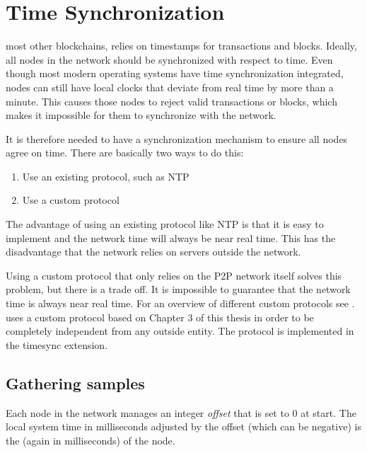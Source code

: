\section{Time Synchronization}
\label{sec:timesync}


 most other blockchains, \codenamespace relies on timestamps for transactions and blocks.
Ideally, all nodes in the network should be synchronized with respect to time.
Even though most modern operating systems have time synchronization integrated,
nodes can still have local clocks that deviate from real time by more than a minute.
This causes those nodes to reject valid transactions or blocks, which makes it impossible for them to synchronize with the network.

It is therefore needed to have a synchronization mechanism to ensure all nodes agree on time.
There are basically two ways to do this:
\begin{enumerate}
\item Use an existing protocol, such as NTP
\item Use a custom protocol
\end{enumerate}

The advantage of using an existing protocol like NTP is that it is easy to implement and the network time will always be near real time.
This has the disadvantage that the network relies on servers outside the network.

Using a custom protocol that only relies on the P2P network itself solves this problem, but there is a trade off.
It is impossible to guarantee that the network time is always near real time.
For an overview of different custom protocols see \cite{Scipioni2009}.
\codenamespace uses a custom protocol based on Chapter 3 of this thesis in order to be completely independent from any outside entity.
The protocol is implemented in the timesync extension.

\subsection{Gathering samples}

Each node in the network manages an integer \emph{offset} that is set to 0 at start.
The local system time in milliseconds adjusted by the offset (which can be negative) is the  (again in milliseconds) of the node.

